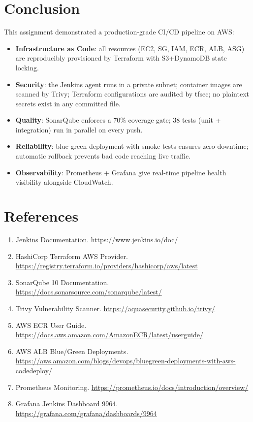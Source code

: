 \documentclass[12pt,a4paper]{article}
\begin{document}
\newpage
\section*{Conclusion}

This assignment demonstrated a production-grade CI/CD pipeline on AWS:

\begin{itemize}[leftmargin=*]
  \item \textbf{Infrastructure as Code}: all resources (EC2, SG, IAM, ECR, ALB, ASG)
        are reproducibly provisioned by Terraform with S3+DynamoDB state locking.
  \item \textbf{Security}: the Jenkins agent runs in a private subnet; container images
        are scanned by Trivy; Terraform configurations are audited by tfsec; no
        plaintext secrets exist in any committed file.
  \item \textbf{Quality}: SonarQube enforces a 70\% coverage gate; 38 tests (unit +
        integration) run in parallel on every push.
  \item \textbf{Reliability}: blue-green deployment with smoke tests ensures zero
        downtime; automatic rollback prevents bad code reaching live traffic.
  \item \textbf{Observability}: Prometheus + Grafana give real-time pipeline health
        visibility alongside CloudWatch.
\end{itemize}

\section*{References}

\begin{enumerate}[leftmargin=*]
  \item Jenkins Documentation. \url{https://www.jenkins.io/doc/}
  \item HashiCorp Terraform AWS Provider. \url{https://registry.terraform.io/providers/hashicorp/aws/latest}
  \item SonarQube 10 Documentation. \url{https://docs.sonarsource.com/sonarqube/latest/}
  \item Trivy Vulnerability Scanner. \url{https://aquasecurity.github.io/trivy/}
  \item AWS ECR User Guide. \url{https://docs.aws.amazon.com/AmazonECR/latest/userguide/}
  \item AWS ALB Blue/Green Deployments. \url{https://aws.amazon.com/blogs/devops/bluegreen-deployments-with-aws-codedeploy/}
  \item Prometheus Monitoring. \url{https://prometheus.io/docs/introduction/overview/}
  \item Grafana Jenkins Dashboard 9964. \url{https://grafana.com/grafana/dashboards/9964}
\end{enumerate}
\end{document}
